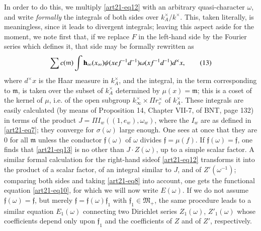 In order to do this, we multiply \eqref{art21-eq12} with an arbitrary quasi-chara\-cter $\omega$, and write {\em formally} the integrals of both sides over $k^{\times}_{A}/k^{\times}$. This, taken literally, is meaningless, since it leads to divergent integrals; leaving this aspect aside for the moment, we note first that, if we replace $F$ in the left-hand side by the Fourier series which defines it, that side may be formally rewritten as 
\begin{equation*}
\sum c(\mathfrak{m})\int \mathbf{h}_{\infty}(x_{\infty})\psi (xef^{-1}d^{-1})\omega(xf^{-1}d^{-1})d^{\times}x,\tag{13}\label{art21-eq13}
\end{equation*}
where $d^{\times}x$ is the Haar measure in $k^{\times}_{A}$, and the integral, in the term corresponding to $\mathfrak{m}$, is taken over the subset of $k^{\times}_{A}$ determined by $\mu(x)=\mathfrak{m}$; this is a coset of the kernel of $\mu$, i.e. of the open subgroup $k^{\times}_{\infty}\times \Pi r^{\times}_{v}$ of $k^{\times}_{A}$. These integrals are easily calculated (by means of Proposition 14, Chapter VII-7, of BNT, page 132) in terms of the product $J=\Pi I_{w}((1,e_{w}),\omega_{w})$, where the $I_{w}$ are as defined in \eqref{art21-eq7}; they converge for $\sigma(\omega)$ large enough. One sees at once that they are $0$ for all $\mathfrak{m}$ unless the conductor $\mathfrak{f}(\omega)$ of $\omega$ divides $\mathfrak{f}=\mu(f)$. If $\mathfrak{f}(\omega)=\mathfrak{f}$, one finds that \eqref{art21-eq13} is no other than $J\cdot Z(\omega)$, up to a simple scalar factor. A similar formal calculation for the right-hand side\pageoriginale of \eqref{art21-eq12} transforms it into the product of a scalar factor, of an integral similar to $J$, and of $Z'(\omega^{-1})$; comparing both sides and taking \eqref{art21-eq8} into account, one gets the functional equation \eqref{art21-eq10}, for which we will now write $E(\omega)$. If we do not assume $\mathfrak{f}(\omega)=\mathfrak{f}$, but merely $\mathfrak{f}=\mathfrak{f}(\omega)\mathfrak{f}_{1}$ with $\mathfrak{f}_{1}\in \mathfrak{M}_{+}$, the same procedure leads to a similar equation $E_{1}(\omega)$ connecting two Dirichlet series $Z_{1}(\omega)$, $Z'_{1}(\omega)$ whose coefficients depend only upon $\mathfrak{f}_{1}$ and the coefficients of $Z$ and of $Z'$, respectively.


